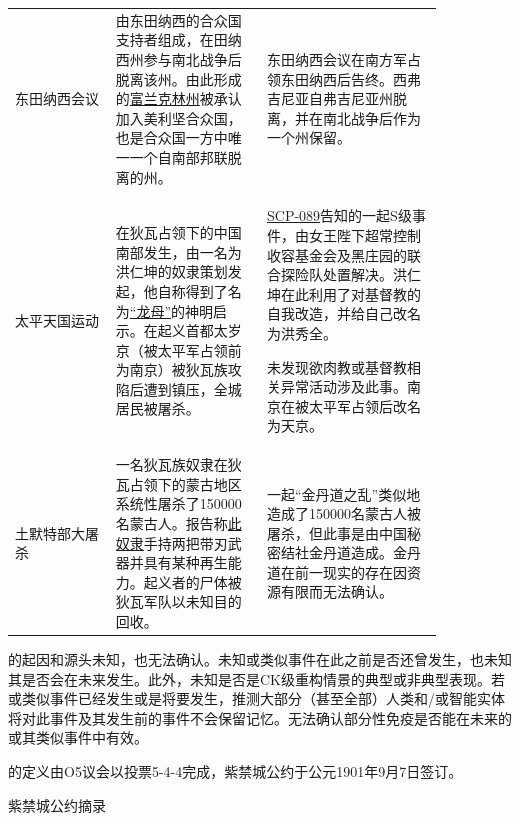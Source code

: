 \begin{longtable}{m{0.2\linewidth}m{0.3\linewidth}m{0.35\linewidth}}
东田纳西会议 & 由东田纳西的合众国支持者组成，在田纳西州参与南北战争后脱离该州。由此形成的\hyperref[chap:SCP-1328]{富兰克林州}被承认加入美利坚合众国，也是合众国一方中唯一一个自南部邦联脱离的州。& 东田纳西会议在南方军占领东田纳西后告终。西弗吉尼亚自弗吉尼亚州脱离，并在南北战争后作为一个州保留。\\
太平天国运动 & 在狄瓦占领下的中国南部发生，由一名为洪仁坤的奴隶策划发起，他自称得到了名为\hyperref[doc:2481]{“龙母”}的神明启示。在起义首都太岁京（被太平军占领前为南京）被狄瓦族攻陷后遭到镇压，全城居民被屠杀。& \hyperref[chap:SCP-089]{SCP-089}告知的一起S级事件，由女王陛下超常控制收容基金会及黑庄园的联合探险队处置解决。洪仁坤在此利用了对基督教的自我改造，并给自己改名为洪秀全。\par 未发现欲肉教或基督教相关异常活动涉及此事。南京在被太平军占领后改名为天京。\\
土默特部大屠杀 & 一名狄瓦族奴隶在狄瓦占领下的蒙古地区系统性屠杀了150000名蒙古人。报告称\hyperref[chap:SCP-076]{此奴隶}手持两把带刃武器并具有某种再生能力。起义者的尸体被狄瓦军队以未知目的回收。& 一起“金丹道之乱”类似地造成了150000名蒙古人被屠杀，但此事是由中国秘密结社金丹道造成。金丹道在前一现实的存在因资源有限而无法确认。
\end{longtable}

的起因和源头未知，也无法确认。未知或类似事件在此之前是否还曾发生，也未知其是否会在未来发生。此外，未知是否是CK级重构情景的典型或非典型表现。若或类似事件已经发生或是将要发生，推测大部分（甚至全部）人类和/或智能实体将对此事件及其发生前的事件不会保留记忆。无法确认部分性免疫是否能在未来的或其类似事件中有效。

的定义由O5议会以投票5-4-4完成，紫禁城公约于公元1901年9月7日签订。

紫禁城公约摘录


